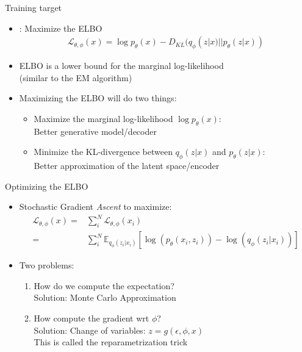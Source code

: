 \documentclass[10pt]{beamer}
\begin{document}
\begin{frame}{Training target}

\begin{itemize}
\item {}: Maximize the ELBO
\begin{align*}
\mathcal{L}_{\theta,\phi}(x) = \log p_\theta(x) - D_{KL}(q_\phi(z|x)||p_\theta(z|x))
\end{align*}
\item ELBO is a lower bound for the marginal log-likelihood\\ (similar to the EM algorithm)
\pause
\item Maximizing the ELBO will do two things:
\begin{itemize}
\item Maximize the marginal log-likelihood $\log p_\theta(x)$:\\Better generative model/decoder
\item Minimize the KL-divergence between $q_\phi(z|x)$ and $p_\theta(z|x)$:\\Better approximation of the latent space/encoder
\end{itemize}
\end{itemize}

\end{frame}



\begin{frame}{Optimizing the ELBO}

\begin{itemize}
\item Stochastic Gradient \emph{Ascent} to maximize:
\begin{align*}
\mathcal{L}_{\theta,\phi}(x) =& \sum_i^N \mathcal{L}_{\theta,\phi}(x_i)\\
=& \sum_i^N \mathbb{E}_{q_\phi(z_i|x_i)}\left[\log \left(p_\theta(x_i,z_i)\right) - \log(q_\phi(z_i|x_i))\right]
\end{align*}
\pause
\item Two problems:
\begin{enumerate}
\item How do we compute the expectation? \\ Solution: {\color{uured} Monte Carlo Approximation}\pause
\item How compute the gradient wrt $\phi$?\\ Solution: {\color{uured}Change of variables}: $z = g(\epsilon, \phi, x)$\\This is called {\color{uured}the reparametrization trick}
\end{enumerate}
\end{itemize}

\end{frame}
\end{document}
